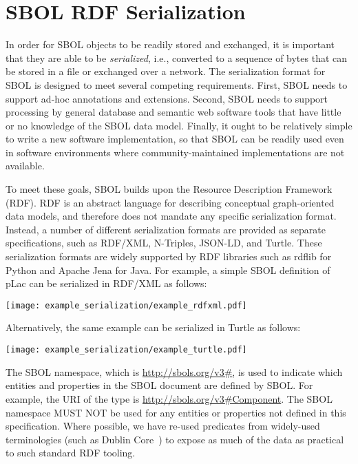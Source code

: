 \section{SBOL RDF Serialization}
\label{sec:serialization}

In order for SBOL objects to be readily stored and exchanged, it is important that they are able to be {\em serialized}, i.e., converted to a sequence of bytes that can be stored in a file or exchanged over a network.  The serialization format for SBOL is designed to meet several competing requirements. 
First, SBOL needs to support ad-hoc annotations and extensions. 
Second, SBOL needs to support processing by general database and semantic web software tools that have little or no knowledge of the SBOL data model. 
Finally, it ought to be relatively simple to write a new software implementation, so that SBOL can be readily used even in software environments where community-maintained implementations are not available.

To meet these goals, SBOL builds upon the Resource Description Framework (RDF).  RDF is an abstract language for describing conceptual graph-oriented data models, and therefore does not mandate any specific serialization format.  Instead, a number of different serialization formats are provided as separate specifications, such as RDF/XML, N-Triples, JSON-LD, and Turtle.  These serialization formats are widely supported by RDF libraries such as rdflib for Python and Apache Jena for Java.   For example, a simple SBOL definition of pLac can be serialized in RDF/XML as follows:

\vspace{3mm}
\texttt{[image: example\_serialization/example\_rdfxml.pdf]}

Alternatively, the same example can be serialized in Turtle as follows:

\vspace{3mm}
\texttt{[image: example\_serialization/example\_turtle.pdf]}

The SBOL namespace, which is \url{http://sbols.org/v3\#}, is used to indicate which entities and properties in the SBOL document are defined by SBOL. For example, the URI of the type  is \url{http://sbols.org/v3\#Component}. The SBOL namespace MUST NOT be used for any entities or properties not defined in this specification.  Where possible, we have re-used predicates from widely-used terminologies (such as Dublin Core~\cite{dcmi2012}) to expose as much of the data as practical to such standard RDF tooling.


